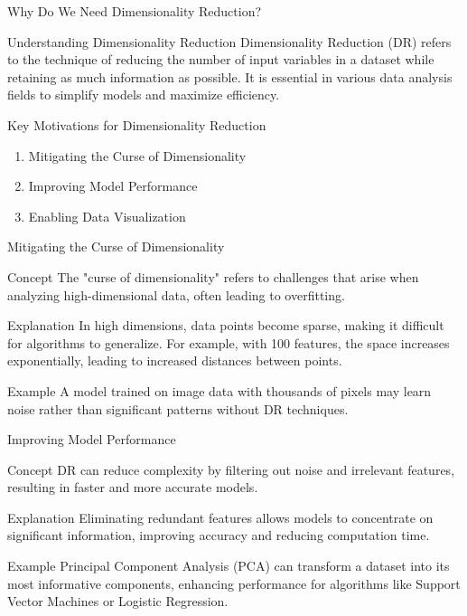 \documentclass[aspectratio=169]{beamer}
\begin{document}
\begin{frame}[fragile]{Why Do We Need Dimensionality Reduction?}
    \begin{block}{Understanding Dimensionality Reduction}
        Dimensionality Reduction (DR) refers to the technique of reducing the number of input variables in a dataset while retaining as much information as possible. 
        It is essential in various data analysis fields to simplify models and maximize efficiency.
    \end{block}
\end{frame}

\begin{frame}[fragile]{Key Motivations for Dimensionality Reduction}
    \begin{enumerate}
        \item Mitigating the Curse of Dimensionality
        \item Improving Model Performance
        \item Enabling Data Visualization
    \end{enumerate}
\end{frame}

\begin{frame}[fragile]{Mitigating the Curse of Dimensionality}
    \begin{block}{Concept}
        The "curse of dimensionality" refers to challenges that arise when analyzing high-dimensional data, often leading to overfitting.
    \end{block}
    \begin{block}{Explanation}
        In high dimensions, data points become sparse, making it difficult for algorithms to generalize. For example, with 100 features, the space increases exponentially, leading to increased distances between points.
    \end{block}
    \begin{block}{Example}
        A model trained on image data with thousands of pixels may learn noise rather than significant patterns without DR techniques.
    \end{block}
\end{frame}

\begin{frame}[fragile]{Improving Model Performance}
    \begin{block}{Concept}
        DR can reduce complexity by filtering out noise and irrelevant features, resulting in faster and more accurate models.
    \end{block}
    \begin{block}{Explanation}
        Eliminating redundant features allows models to concentrate on significant information, improving accuracy and reducing computation time.
    \end{block}
    \begin{block}{Example}
        Principal Component Analysis (PCA) can transform a dataset into its most informative components, enhancing performance for algorithms like Support Vector Machines or Logistic Regression.
    \end{block}
\end{frame}
\end{document}
